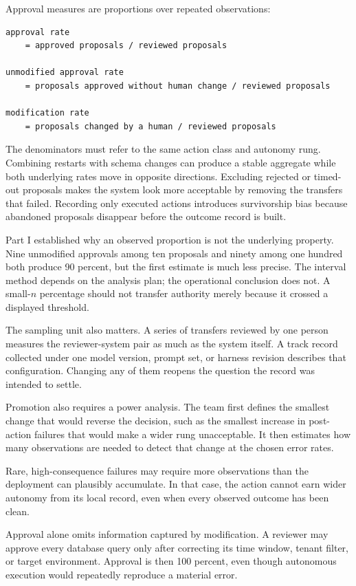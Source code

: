Approval measures are proportions over repeated observations:

\begin{verbatim}
approval rate
    = approved proposals / reviewed proposals

unmodified approval rate
    = proposals approved without human change / reviewed proposals

modification rate
    = proposals changed by a human / reviewed proposals
\end{verbatim}

The denominators must refer to the same action class and autonomy rung. Combining restarts with schema changes can produce a stable aggregate while both underlying rates move in opposite directions. Excluding rejected or timed-out proposals makes the system look more acceptable by removing the transfers that failed. Recording only executed actions introduces survivorship bias because abandoned proposals disappear before the outcome record is built.

Part I established why an observed proportion is not the underlying property. Nine unmodified approvals among ten proposals and ninety among one hundred both produce 90 percent, but the first estimate is much less precise. The interval method depends on the analysis plan; the operational conclusion does not. A small-\(n\) percentage should not transfer authority merely because it crossed a displayed threshold.

The sampling unit also matters. A series of transfers reviewed by one person measures the reviewer-system pair as much as the system itself. A track record collected under one model version, prompt set, or harness revision describes that configuration. Changing any of them reopens the question the record was intended to settle.

Promotion also requires a power analysis. The team first defines the smallest change that would reverse the decision, such as the smallest increase in post-action failures that would make a wider rung unacceptable. It then estimates how many observations are needed to detect that change at the chosen error rates.

Rare, high-consequence failures may require more observations than the deployment can plausibly accumulate. In that case, the action cannot earn wider autonomy from its local record, even when every observed outcome has been clean.

Approval alone omits information captured by modification. A reviewer may approve every database query only after correcting its time window, tenant filter, or target environment. Approval is then 100 percent, even though autonomous execution would repeatedly reproduce a material error.

